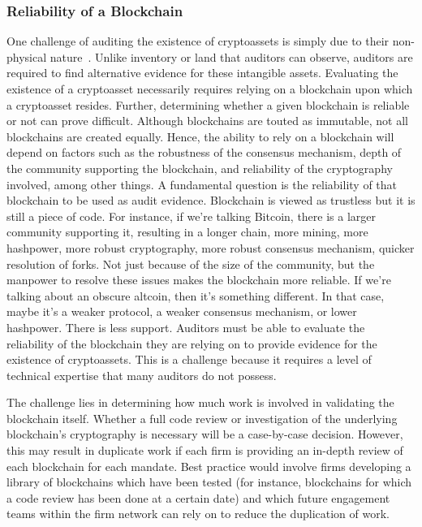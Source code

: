 \subsubsection{Reliability of a Blockchain}
One challenge of auditing the existence of cryptoassets is simply due to their non-physical nature~\cite{pimentel2021systemizing}. Unlike inventory or land that auditors can observe, auditors are required to find alternative evidence for these intangible assets. Evaluating the existence of a cryptoasset necessarily requires relying on a blockchain upon which a cryptoasset resides. Further, determining whether a given blockchain is reliable or not can prove difficult. Although blockchains are touted as immutable, not all blockchains are created equally. Hence, the ability to rely on a blockchain will depend on factors such as the robustness of the consensus mechanism, depth of the community supporting the blockchain, and reliability of the cryptography involved, among other things.
A fundamental question is the reliability of that blockchain to be used as audit evidence. Blockchain is viewed as trustless but it is still a piece of code. For instance, if we're talking Bitcoin, there is a larger community supporting it, resulting in a longer chain, more mining, more hashpower, more robust cryptography, more robust consensus mechanism, quicker resolution of forks. Not just because of the size of the community, but the manpower to resolve these issues makes the blockchain more reliable. If we're talking about an obscure altcoin, then it's something different. In that case, maybe it's a weaker protocol, a weaker consensus mechanism, or lower hashpower. There is less support.
Auditors must be able to evaluate the reliability of the blockchain they are relying on to provide evidence for the existence of cryptoassets. This is a challenge because it requires a level of technical expertise that many auditors do not possess.

The challenge lies in determining how much work is involved in validating the blockchain itself. Whether a full code review or investigation of the underlying blockchain's cryptography is necessary will be a case-by-case decision. However, this may result in duplicate work if each firm is providing an in-depth review of each blockchain for each mandate. Best practice would involve firms developing a library of blockchains which have been tested (for instance, blockchains for which a code review has been done at a certain date) and which future engagement teams within the firm network can rely on to reduce the duplication of work.

